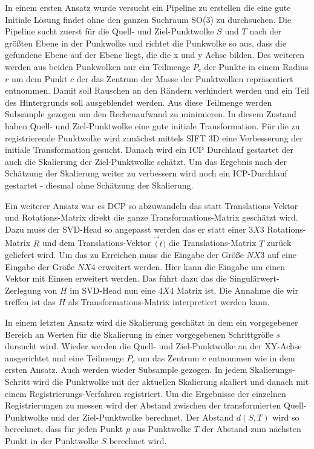\documentclass[12pt,titlepage, twoside]{article}
\begin{document}
In einem ersten Ansatz wurde versucht ein Pipeline zu erstellen die eine gute Initiale Lösung findet ohne den ganzen Suchraum SO(3) zu durchsuchen.
Die Pipeline sucht zuerst für die Quell- und Ziel-Punktwolke $S$ und $T$ nach der größten Ebene in der Punkwolke und richtet die Punkwolke so aus, dass die gefundene Ebene auf der Ebene liegt, die die x und y Achse bilden.
Des weiteren werden aus beiden Punkwolken nur ein Teilmenge $P_c$ der Punkte in einem Radius $r$ um dem Punkt $c$ der das Zentrum der Masse der Punktwolken repräsentiert entnommen.
Damit soll Rauschen an den Rändern verhindert werden und ein Teil des Hintergrunds soll ausgeblendet werden.
Aus diese Teilmenge werden Subsample gezogen um den Rechenaufwand zu minimieren. In diesem Zustand haben Quell- und Ziel-Punktwolke eine gute initiale Transformation.
Für die zu registrierende Punktwolke wird zunächst mittels SIFT 3D eine Verbesserung der initiale Transformation gesucht. Danach wird ein ICP Durchlauf gestartet der auch die Skalierung der Ziel-Punktwolke schätzt.
Um das Ergebnis nach der Schätzung der Skalierung weiter zu verbessern wird noch ein ICP-Durchlauf gestartet - diesmal ohne Schätzung der Skalierung.

Ein weiterer Ansatz war es DCP so abzuwandeln das statt Translations-Vektor und Rotations-Matrix direkt die ganze Transformations-Matrix geschätzt wird. 
Dazu muss der SVD-Head so angepasst werden das er statt einer $3X3$ Rotations-Matrix $R$ und dem Translations-Vektor $\vec(t)$ die Translations-Matrix $T$ zurück geliefert wird.
Um das zu Erreichen muss die Eingabe der Größe $NX3$ auf eine Eingabe der Größe $NX4$ erweitert werden. Hier kann die Eingabe um einen Vektor mit Einsen erweitert werden.
Das führt dazu das die Singulärwert-Zerlegung von $H$ im SVD-Head nun eine $4X4$ Matrix ist. Die Annahme die wir treffen ist das $H$ als Transformations-Matrix interpretiert werden kann.

In einem letzten Ansatz wird die Skalierung geschätzt in dem ein vorgegebener Bereich an Werten für die Skalierung in einer vorgegebenen Schrittgröße $s$ dursucht wird.
Wieder werden die Quell- und Ziel-Punktwolke an der XY-Achse ausgerichtet und eine Teilmenge $P_c$ um das Zentrum $c$ entnommen wie in dem ersten Ansatz. Auch werden wieder Subsample gezogen.
In jedem Skalierungs-Schritt wird die Punktwolke mit der aktuellen Skalierung skaliert und danach mit einem Registrierungs-Verfahren registriert.
Um die Ergebnisse der einzelnen Registrierungen zu messen wird der Abstand zwischen der transformierten Quell-Punktwolke und der Ziel-Punktwolke berechnet. 
Der Abstand $d(S,T)$ wird so berechnet, dass für jeden Punkt $p$ aus Punktwolke $T$ der Abstand zum nächsten Punkt in der Punktwolke $S$ berechnet wird.
\end{document}
